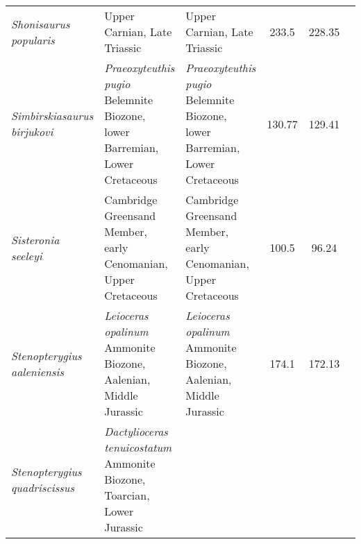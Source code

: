 \begin{longtabu}{>{\itshape}lXXSSl}
	Shonisaurus popularis                                & Upper Carnian,
        Late Triassic
                                                             & Upper Carnian,
        Late Triassic
                                                             & 233.5
                                                             & 228.35
                                                             &
                                                             \cite{Camp1980PAPS} \\                       
	Simbirskiasaurus birjukovi                           &
        \emph{Praeoxyteuthis pugio} Belemnite Biozone, lower Barremian, Lower
        Cretaceous                                                   &
        \emph{Praeoxyteuthis pugio} Belemnite Biozone, lower Barremian, Lower
        Cretaceous                                                   & 130.77
                                                                     & 129.41
                                                                     &
                                                                     \cite{Fischer2014ZJLS} \\                   
	Sisteronia seeleyi                                   & Cambridge
        Greensand Member, early Cenomanian, Upper Cretaceous
                                                             & Cambridge
        Greensand Member, early Cenomanian, Upper Cretaceous
                                                             & 100.5
                                                             & 96.24
                                                             &
                                                             \cite{Fischer2014PO} \\                   
	Stenopterygius aaleniensis                           & \emph{Leioceras
        opalinum} Ammonite Biozone, Aalenian, Middle Jurassic
                                                             & \emph{Leioceras
        opalinum} Ammonite Biozone, Aalenian, Middle Jurassic
                                                             & 174.1
                                                             & 172.13
                                                             &
                                                             \cite{Maxwell2012PO} \\                   
	Stenopterygius quadriscissus                         &
        \emph{Dactylioceras tenuicostatum} Ammonite Biozone, Toarcian, Lower
        Jurassic                                                      &

\end{longtabu}
